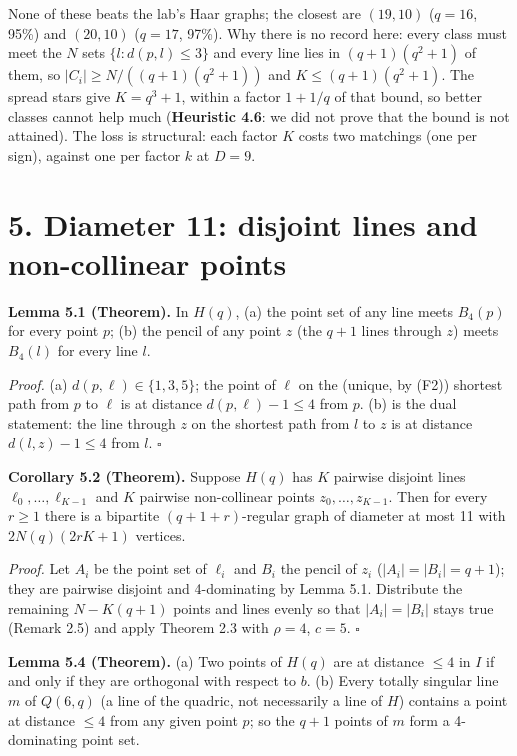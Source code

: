 \documentclass[
  10pt,
]{article}
\begin{document}
None of these beats the lab's Haar graphs; the closest are \((19,10)\)
(\(q = 16\), 95\%) and \((20,10)\) (\(q = 17\), 97\%). Why there is no
record here: every class must meet the \(N\) sets
\(\{l : d(p,l)\le 3\}\) and every line lies in \((q+1)(q^2+1)\) of them,
so \(|C_i|\ge N/((q+1)(q^2+1))\) and \(K\le (q+1)(q^2+1)\). The spread
stars give \(K = q^3+1\), within a factor \(1+1/q\) of that bound, so
better classes cannot help much (\textbf{Heuristic 4.6}: we did not
prove that the bound is not attained). The loss is structural: each
factor \(K\) costs two matchings (one per sign), against one per factor
\(k\) at \(D = 9\).

\hypertarget{diameter-11-disjoint-lines-and-non-collinear-points}{%
\section{5. Diameter 11: disjoint lines and non-collinear
points}\label{diameter-11-disjoint-lines-and-non-collinear-points}}

\textbf{Lemma 5.1 (Theorem).} In \(H(q)\), (a) the point set of any line
meets \(B_4(p)\) for every point \(p\); (b) the pencil of any point
\(z\) (the \(q+1\) lines through \(z\)) meets \(B_4(l)\) for every line
\(l\).

\emph{Proof.} (a) \(d(p,\ell)\in\{1,3,5\}\); the point of \(\ell\) on
the (unique, by (F2)) shortest path from \(p\) to \(\ell\) is at
distance \(d(p,\ell)-1\le 4\) from \(p\). (b) is the dual statement: the
line through \(z\) on the shortest path from \(l\) to \(z\) is at
distance \(d(l,z)-1\le 4\) from \(l\). \(\square\)

\textbf{Corollary 5.2 (Theorem).} Suppose \(H(q)\) has \(K\) pairwise
disjoint lines \(\ell_0,\dots,\ell_{K-1}\) and \(K\) pairwise
non-collinear points \(z_0,\dots,z_{K-1}\). Then for every \(r\ge 1\)
there is a bipartite \((q+1+r)\)-regular graph of diameter at most 11
with \(2N(q)(2rK+1)\) vertices.

\emph{Proof.} Let \(A_i\) be the point set of \(\ell_i\) and \(B_i\) the
pencil of \(z_i\) (\(|A_i| = |B_i| = q+1\)); they are pairwise disjoint
and 4-dominating by Lemma 5.1. Distribute the remaining \(N-K(q+1)\)
points and lines evenly so that \(|A_i| = |B_i|\) stays true (Remark
2.5) and apply Theorem 2.3 with \(\rho = 4\), \(c = 5\). \(\square\)

\textbf{Lemma 5.4 (Theorem).} (a) Two points of \(H(q)\) are at distance
\(\le 4\) in \(I\) if and only if they are orthogonal with respect to
\(b\). (b) Every totally singular line \(m\) of \(Q(6,q)\) (a line of
the quadric, not necessarily a line of \(H\)) contains a point at
distance \(\le 4\) from any given point \(p\); so the \(q+1\) points of
\(m\) form a 4-dominating point set.
\end{document}
